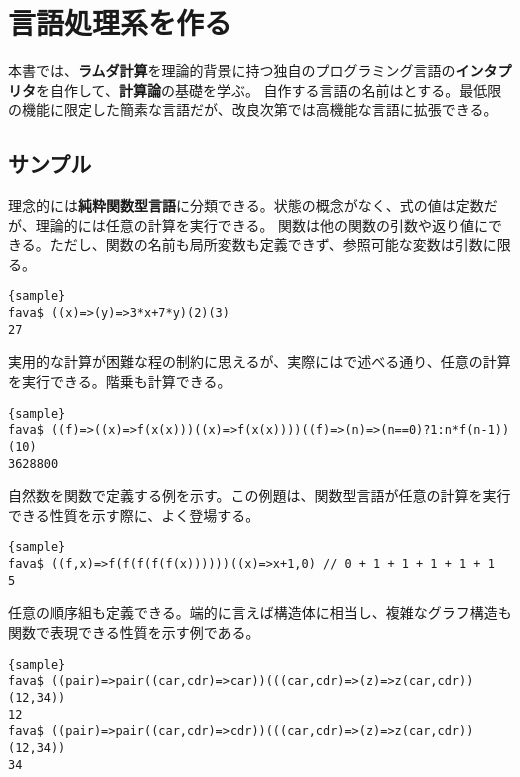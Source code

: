 \documentclass[10pt,a4paper]{book}
\begin{document}
\maketitle
\tableofcontents

\chapter{言語処理系を作る}

本書では、\textbf{ラムダ計算}を理論的背景に持つ独自のプログラミング言語の\textbf{インタプリタ}を自作して、\textbf{計算論}の基礎を学ぶ。
自作する言語の名前は\fava{}とする。最低限の機能に限定した簡素な言語だが、改良次第では高機能な言語に拡張できる。

\section{サンプル}

理念的には\textbf{純粋関数型言語}に分類できる。状態の概念がなく、式の値は定数だが、理論的には任意の計算を実行できる。
関数は他の関数の引数や返り値にできる。ただし、関数の名前も局所変数も定義できず、参照可能な変数は引数に限る。

\begin{Verbatim}{sample}
fava$ ((x)=>(y)=>3*x+7*y)(2)(3)
27
\end{Verbatim}

実用的な計算が困難な程の制約に思えるが、実際にはで述べる通り、任意の計算を実行できる。階乗も計算できる。

\begin{Verbatim}{sample}
fava$ ((f)=>((x)=>f(x(x)))((x)=>f(x(x))))((f)=>(n)=>(n==0)?1:n*f(n-1))(10)
3628800
\end{Verbatim}

自然数を関数で定義する例を示す。この例題は、関数型言語が任意の計算を実行できる性質を示す際に、よく登場する。

\begin{Verbatim}{sample}
fava$ ((f,x)=>f(f(f(f(f(x))))))((x)=>x+1,0) // 0 + 1 + 1 + 1 + 1 + 1
5
\end{Verbatim}

任意の順序組も定義できる。端的に言えば構造体に相当し、複雑なグラフ構造も関数で表現できる性質を示す例である。

\begin{Verbatim}{sample}
fava$ ((pair)=>pair((car,cdr)=>car))(((car,cdr)=>(z)=>z(car,cdr))(12,34))
12
fava$ ((pair)=>pair((car,cdr)=>cdr))(((car,cdr)=>(z)=>z(car,cdr))(12,34))
34
\end{Verbatim}
\end{document}
